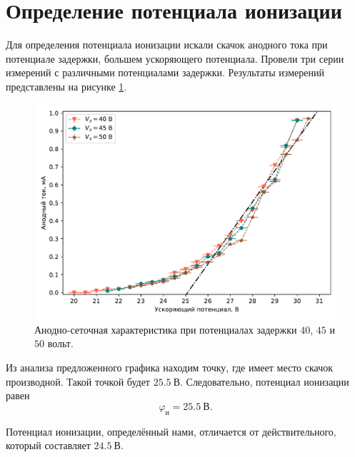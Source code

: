 \documentclass[12pt]{article}
\begin{document}
	\section{Определение потенциала ионизации}
	Для определения потенциала ионизации искали скачок анодного тока при потенциале задержки, большем ускоряющего потенциала. Провели три серии измерений с различными потенциалами задержки. Результаты измерений представлены на рисунке \ref{fig:figure2}.
	\begin{figure}[htbp]
		\centering
		\includegraphics[width=\linewidth]{../plots/2}
		\caption{Анодно-сеточная характеристика при потенциалах задержки $40$, $45$ и $50$ вольт.}
		\label{fig:figure2}
	\end{figure}
	Из анализа предложенного графика находим точку, где имеет место скачок производной. Такой точкой будет $25.5\ \text{В}$. Следовательно, потенциал ионизации равен 
	\begin{equation}
		\varphi_\text{и} = 25.5\ \text{В}.
	\end{equation}
	\par Потенциал ионизации, определённый нами, отличается от действительного, который составляет $24.5\ \text{В}$.
\end{document}
